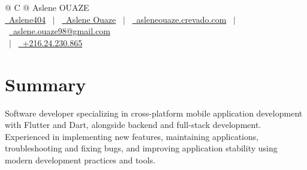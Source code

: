 \documentclass[a4paper,12pt]{article}
\begin{document}
\pagestyle{empty} 



\begin{tabularx}{\linewidth}{@{} C @{}}
\Huge{Aslene OUAZE} \\[7.5pt]
\href{https://github.com/Aslene404}{\raisebox{-0.05\height}\faGithub\ Aslene404} \ $|$ \ 
\href{https://www.linkedin.com/in/aslene-ouaze-3b5aa91b3}{\raisebox{-0.05\height}\faLinkedin\ Aslene Ouaze} \ $|$ \ 
\href{https://asleneouaze.crevado.com}{\raisebox{-0.05\height}\faGlobe \ asleneouaze.crevado.com} \ $|$ \ 
\href{mailto:aslene.ouaze98@gmail.com}{\raisebox{-0.05\height}\faEnvelope \ aslene.ouaze98@gmail.com} \\ \ $|$ \ 
\href{tel:+21624230865}{\raisebox{-0.05\height}\faMobile \ +216.24.230.865} \\
\end{tabularx}


\section{Summary}
Software developer specializing in cross-platform mobile application development with Flutter and Dart, alongside backend and full-stack development. Experienced in implementing new features, maintaining applications, troubleshooting and fixing bugs, and improving application stability using modern development practices and tools.

\end{document}
